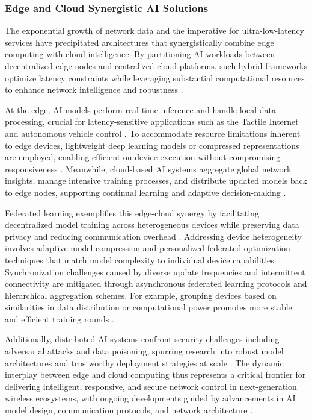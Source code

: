 \documentclass[sigconf]{acmart}
\begin{document}
\subsubsection{Edge and Cloud Synergistic AI Solutions}

The exponential growth of network data and the imperative for ultra-low-latency services have precipitated architectures that synergistically combine edge computing with cloud intelligence. By partitioning AI workloads between decentralized edge nodes and centralized cloud platforms, such hybrid frameworks optimize latency constraints while leveraging substantial computational resources to enhance network intelligence and robustness \cite{ref8,ref9,ref13,ref16,ref49,ref50}.

At the edge, AI models perform real-time inference and handle local data processing, crucial for latency-sensitive applications such as the Tactile Internet and autonomous vehicle control \cite{ref10}. To accommodate resource limitations inherent to edge devices, lightweight deep learning models or compressed representations are employed, enabling efficient on-device execution without compromising responsiveness \cite{ref8,ref13}. Meanwhile, cloud-based AI systems aggregate global network insights, manage intensive training processes, and distribute updated models back to edge nodes, supporting continual learning and adaptive decision-making \cite{ref9,ref16}.

Federated learning exemplifies this edge-cloud synergy by facilitating decentralized model training across heterogeneous devices while preserving data privacy and reducing communication overhead \cite{ref10}. Addressing device heterogeneity involves adaptive model compression and personalized federated optimization techniques that match model complexity to individual device capabilities. Synchronization challenges caused by diverse update frequencies and intermittent connectivity are mitigated through asynchronous federated learning protocols and hierarchical aggregation schemes. For example, grouping devices based on similarities in data distribution or computational power promotes more stable and efficient training rounds \cite{ref9,ref10}.

Additionally, distributed AI systems confront security challenges including adversarial attacks and data poisoning, spurring research into robust model architectures and trustworthy deployment strategies at scale \cite{ref49,ref50}. The dynamic interplay between edge and cloud computing thus represents a critical frontier for delivering intelligent, responsive, and secure network control in next-generation wireless ecosystems, with ongoing developments guided by advancements in AI model design, communication protocols, and network architecture \cite{ref10,ref13,ref49,ref50}.
\end{document}
